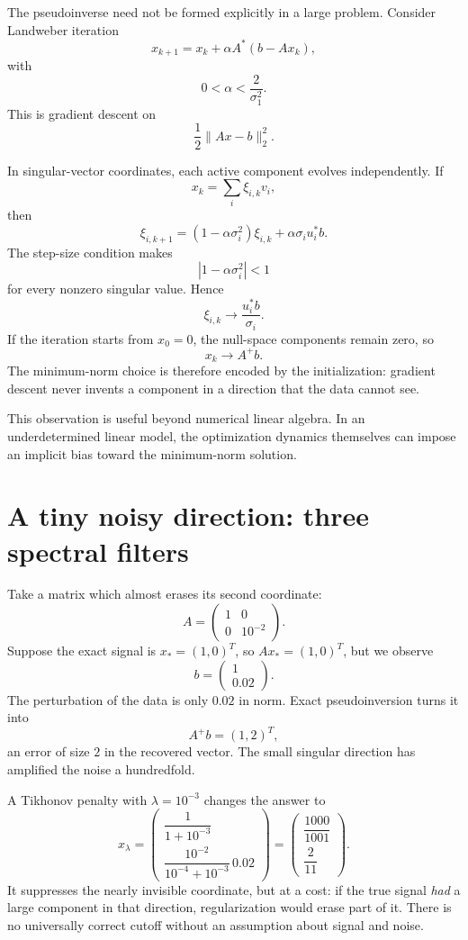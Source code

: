 The pseudoinverse need not be formed explicitly in a large problem.  Consider Landweber iteration
\[
  x_{k+1}
  =x_k+\alpha A^*(b-Ax_k),
\]
with
\[
  0<\alpha<\frac{2}{\sigma_1^2}.
\]
This is gradient descent on
\[
  \frac12\|Ax-b\|_2^2.
\]

In singular-vector coordinates, each active component evolves independently.  If
\[
  x_k=\sum_i \xi_{i,k}v_i,
\]
then
\[
  \xi_{i,k+1}
  =(1-\alpha\sigma_i^2)\xi_{i,k}
   +\alpha\sigma_i u_i^*b.
\]
The step-size condition makes
\[
  |1-\alpha\sigma_i^2|<1
\]
for every nonzero singular value.  Hence
\[
  \xi_{i,k}\longrightarrow\frac{u_i^*b}{\sigma_i}.
\]
If the iteration starts from \(x_0=0\), the null-space components remain zero, so
\[
  x_k\longrightarrow A^+b.
\]
The minimum-norm choice is therefore encoded by the initialization: gradient descent never invents a component in a direction that the data cannot see.

This observation is useful beyond numerical linear algebra.  In an underdetermined linear model, the optimization dynamics themselves can impose an implicit bias toward the minimum-norm solution.

\section{A tiny noisy direction: three spectral filters}

Take a matrix which almost erases its second coordinate:
\[
 A=\begin{pmatrix}1&0\\0&10^{-2}\end{pmatrix}.
\]
Suppose the exact signal is $x_*=(1,0)^T$, so $Ax_*=(1,0)^T$, but we observe
\[
 b=\begin{pmatrix}1\\ 0.02\end{pmatrix}.
\]
The perturbation of the data is only $0.02$ in norm. Exact pseudoinversion turns it into
\[
 \boxed{A^+b=(1,2)^T,}
\]
an error of size $2$ in the recovered vector. The small singular direction has amplified the noise a hundredfold.

A Tikhonov penalty with $\lambda=10^{-3}$ changes the answer to
\[
 x_\lambda
 =\begin{pmatrix}
      \dfrac{1}{1+10^{-3}}\\[6pt]
      \dfrac{10^{-2}}{10^{-4}+10^{-3}}\,0.02
    \end{pmatrix}
 =\begin{pmatrix}\dfrac{1000}{1001}\\[3pt]\dfrac2{11}\end{pmatrix}.
\]
It suppresses the nearly invisible coordinate, but at a cost: if the true signal \emph{had} a large component in that direction, regularization would erase part of it. There is no universally correct cutoff without an assumption about signal and noise.


